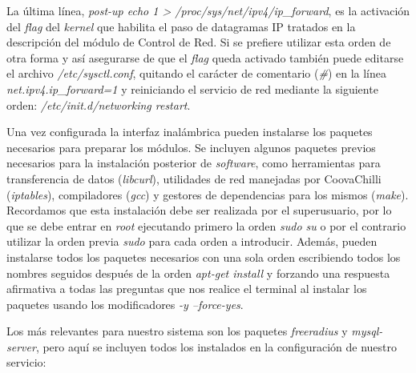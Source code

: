 
La última línea, \emph{post-up echo 1 > /proc/sys/net/ipv4/ip\_forward}, es la activación del \emph{flag} del \emph{kernel} que habilita el paso de datagramas IP tratados en la descripción del módulo de Control de Red. Si se prefiere utilizar esta orden de otra forma y así asegurarse de que el \emph{flag} queda activado también puede editarse el archivo \emph{/etc/sysctl.conf}, quitando el carácter de comentario (\emph{\#}) en la línea \emph{net.ipv4.ip\_forward=1} y reiniciando el servicio de red mediante la siguiente orden: \emph{/etc/init.d/networking restart}.

Una vez configurada la interfaz inalámbrica pueden instalarse los paquetes necesarios para preparar los módulos. Se incluyen algunos paquetes previos necesarios para la instalación posterior de \emph{software}, como herramientas para transferencia de datos (\emph{libcurl}), utilidades de red manejadas por CoovaChilli (\emph{iptables}), compiladores (\emph{gcc}) y gestores de dependencias para los mismos (\emph{make}). Recordamos que esta instalación debe ser realizada por el superusuario, por lo que se debe entrar en \emph{root} ejecutando primero la orden \emph{sudo su} o por el contrario utilizar la orden previa \emph{sudo} para cada orden a introducir. Además, pueden instalarse todos los paquetes necesarios con una sola orden escribiendo todos los nombres seguidos después de la orden \emph{apt-get install} y forzando una respuesta afirmativa a todas las preguntas que nos realice el terminal al instalar los paquetes usando los modificadores \emph{-y --force-yes}.

Los más relevantes para nuestro sistema son los paquetes \emph{freeradius} y \emph{mysql-server}, pero aquí se incluyen todos los instalados en la configuración de nuestro servicio:


